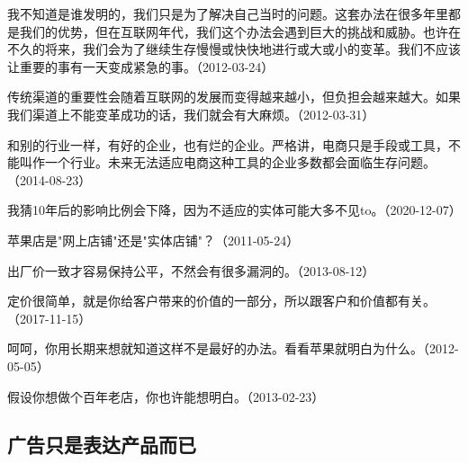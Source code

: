 
我不知道是谁发明的，我们只是为了解决自己当时的问题。这套办法在很多年里都是我们的优势，但在互联网年代，我们这个办法会遇到巨大的挑战和威胁。也许在不久的将来，我们会为了继续生存慢慢或快快地进行或大或小的变革。我们不应该让重要的事有一天变成紧急的事。（2012-03-24）


传统渠道的重要性会随着互联网的发展而变得越来越小，但负担会越来越大。如果我们渠道上不能变革成功的话，我们就会有大麻烦。（2012-03-31）


和别的行业一样，有好的企业，也有烂的企业。严格讲，电商只是手段或工具，不能叫作一个行业。未来无法适应电商这种工具的企业多数都会面临生存问题。（2014-08-23）


我猜10年后的影响比例会下降，因为不适应的实体可能大多不见to。（2020-12-07）


苹果店是"网上店铺"还是"实体店铺"？（2011-05-24）

出厂价一致才容易保持公平，不然会有很多漏洞的。（2013-08-12）


定价很简单，就是你给客户带来的价值的一部分，所以跟客户和价值都有关。（2017-11-15）


呵呵，你用长期来想就知道这样不是最好的办法。看看苹果就明白为什么。（2012-05-05）


假设你想做个百年老店，你也许能想明白。（2013-02-23）

\subsection{广告只是表达产品而已}

